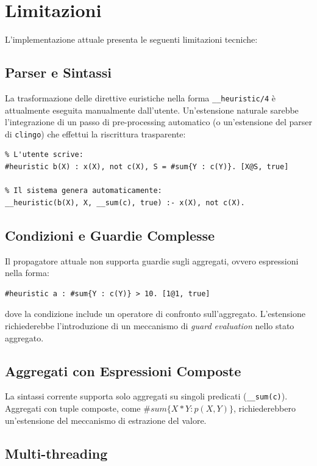 \documentclass[a4paper,12pt,twoside,openright]{report}
\newcommand{\clingo}{\texttt{clingo}}
\begin{document}
\section{Limitazioni}
\label{sec:limitazioni}

L'implementazione attuale presenta le seguenti limitazioni tecniche:

\subsection{Parser e Sintassi}

La trasformazione delle direttive euristiche nella forma \texttt{\_\_heuristic/4} \`{e} attualmente eseguita manualmente dall'utente. Un'estensione naturale sarebbe l'integrazione di un passo di pre-processing automatico (o un'estensione del parser di \clingo{}) che effettui la riscrittura trasparente:

\begin{lstlisting}
% L'utente scrive:
#heuristic b(X) : x(X), not c(X), S = #sum{Y : c(Y)}. [X@S, true]

% Il sistema genera automaticamente:
__heuristic(b(X), X, __sum(c), true) :- x(X), not c(X).
\end{lstlisting}

\subsection{Condizioni e Guardie Complesse}

Il propagatore attuale non supporta guardie sugli aggregati, ovvero espressioni nella forma:
\begin{lstlisting}
#heuristic a : #sum{Y : c(Y)} > 10. [1@1, true]
\end{lstlisting}
dove la condizione include un operatore di confronto sull'aggregato. L'estensione richiederebbe l'introduzione di un meccanismo di \emph{guard evaluation} nello stato aggregato.

\subsection{Aggregati con Espressioni Composte}

La sintassi corrente supporta solo aggregati su singoli predicati (\texttt{\_\_sum(c)}). Aggregati con tuple composte, come $\#sum\{X*Y : p(X,Y)\}$, richiederebbero un'estensione del meccanismo di estrazione del valore.

\subsection{Multi-threading}
\end{document}
